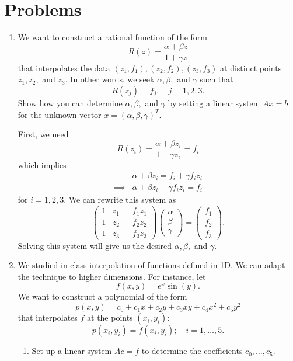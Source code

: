 \documentclass[a4paper,12pt]{article}
\newcommand{\pmat}[1]{\begin{pmatrix} #1 \end{pmatrix}}
\begin{document}
\section*{Problems}
	\begin{enumerate}[label = \arabic*)]
		\item We want to construct a rational function of the form
		\[
			R(z) = \frac{\alpha + \beta z}{1 + \gamma z}
		\]
		that interpolates the data $ (z_1, f_1), (z_2, f_2), (z_3, f_3) $ at distinct points $ z_1, z_2,  $ and $ z_3 $. In other words, we seek $ \alpha, \beta, $ and $ \gamma $ such that 
		\[
			R(z_j) = f_j, \quad j=1,2,3.
		\]
		Show how you can determine $ \alpha, \beta, $ and $ \gamma $ by setting a linear system $ Ax = b $ for the unknown vector $ x = (\alpha, \beta, \gamma)^T $.
		
		First, we need 
		\[
			R(z_i) = \frac{\alpha + \beta z_i}{1 + \gamma z_i} =  f_i
		\]
		which implies
		\begin{align*}
			& \alpha + \beta z_i = f_i + \gamma f_i z_i \\
			\implies & \alpha + \beta z_i - \gamma f_i z_i = f_i
		\end{align*}
		for $ i = 1,2, 3 $. We can rewrite this system as
		\[
			\pmat{1 & z_1 & -f_1 z_1 \\ 1 & z_2 & -f_2 z_2 \\ 1 & z_3 & -f_3 z_3} \pmat{\alpha \\ \beta \\ \gamma} = \pmat{f_1 \\ f_2 \\ f_3}.
		\]
		Solving this system will give us the desired $ \alpha, \beta, $ and $ \gamma $.
		
		\item We studied in class interpolation of functions defined in 1D. We can adapt the technique to higher dimensions. For instance, let
		\[
			f(x,y) = e^x \sin(y).
		\]
		We want to construct a polynomial of the form
		\[
			p(x,y) = c_0 + c_1x + c_2 y + c_3 xy + c_4 x^2 + c_5 y^2
		\]
		that interpolates $ f $ at the points $ (x_i, y_i) $:
		\begin{equation}
			p(x_i,y_i) = f(x_i, y_i); \quad i = 1, \ldots, 5. \label{equ:pol}
		\end{equation}
		
		\begin{enumerate}[label = (\roman*)]
			\item Set up a linear system $ Ac = f $ to determine the coefficients $ c_0, \ldots, c_5 $.
			

\end{enumerate}
\end{enumerate}
\end{document}
